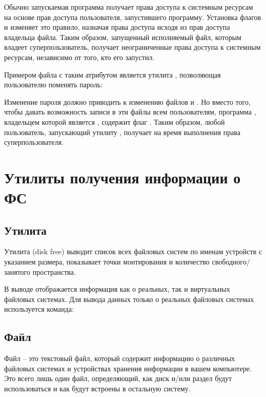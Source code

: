 Обычно запускаемая программа получает права доступа к системным ресурсам на основе прав доступа пользователя, запустившего программу. Установка флагов  и  изменяет это правило, назначая права доступа исходя из прав доступа владельца файла. Таким образом, запущенный исполняемый файл, которым владеет суперпользователь, получает неограниченные права доступа к системным ресурсам, независимо от того, кто его запустил.

Примером файла с таким атрибутом является утилита , позволяющая пользователю поменять пароль:


Изменение пароля должно приводить к изменению файлов  и . Но вместо того, чтобы давать возможность записи в эти файлы всем пользователям, программа , владельцем которой является , содержит флаг . Таким образом, любой пользователь, запускающий утилиту , получает на время выполнения права суперпользователя.


\section{Утилиты получения информации о ФС}

\subsection{Утилита }

Утилита  (disk free) выводит список всех файловых систем по именам устройств с указанием размера, показывает точки монтирования и количество свободного/занятого пространства.


В выводе отображается информация как о реальных, так и виртуальных файловых системах. Для вывода данных только о реальных файловых системах используется команда:



\subsection{Файл }

Файл  -- это текстовый файл, который содержит информацию о различных файловых системах и устройствах хранения информации в вашем компьютере. Это всего лишь один файл, определяющий, как диск и/или раздел будут использоваться и как будут встроены в остальную систему. 


